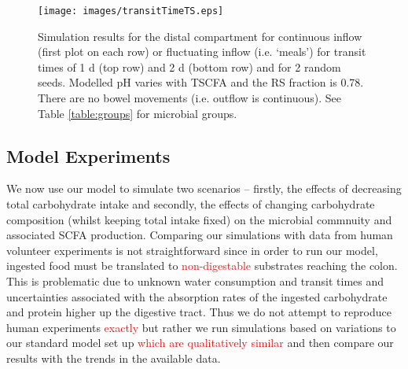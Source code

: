 \documentclass[a4paper]{article}
\begin{document}
 \begin{figure}
    \centering
   \texttt{[image: images/transitTimeTS.eps]}
    \caption{Simulation results for the distal compartment for continuous inflow (first plot on each row) or fluctuating inflow (i.e. `meals') for transit times of 1 d (top row) and 2 d (bottom row) and for 2 random seeds. Modelled pH varies with TSCFA and the RS fraction is 0.78. There are no bowel movements (i.e. outflow is continuous). See Table \ref{table:groups} for microbial groups.
    }
    \label{fig:flucInflowTt}
\end{figure}



\subsection*{Model Experiments}
We now use our model to simulate two scenarios -- firstly, the effects of decreasing total carbohydrate intake and secondly, the effects of changing carbohydrate composition (whilst keeping total intake fixed) on the microbial commnuity and associated SCFA production.
Comparing our simulations with data from human volunteer experiments is not straightforward since in order to run our model, ingested food must be translated to \textcolor{red}{non-digestable} substrates reaching the colon. This is problematic due to unknown water consumption and transit times and uncertainties associated with the absorption rates of the ingested carbohydrate and protein higher up the digestive tract.
Thus we do not attempt to reproduce human experiments \textcolor{red}{exactly} but rather we run simulations based on variations to our standard model set up \textcolor{red}{which are qualitatively similar} and then compare our results with the trends in the available data.



\end{document}
